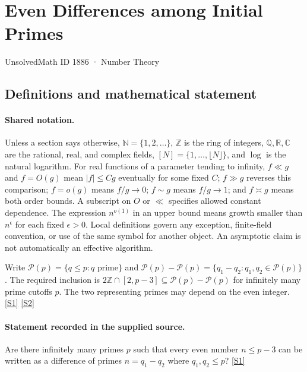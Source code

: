 \documentclass[11pt,a4paper]{article}
\newcommand{\N}{\mathbb{N}}
\newcommand{\Z}{\mathbb{Z}}
\newcommand{\Q}{\mathbb{Q}}
\newcommand{\R}{\mathbb{R}}
\newcommand{\C}{\mathbb{C}}
\newcommand{\sref}[2]{\hyperlink{source:#1:#2}{[S#2]}}
\begin{document}

\setcounter{section}{1885}

\section{Even Differences among Initial Primes}\label{1886}

{\small\sffamily UnsolvedMath ID 1886 · Number Theory}

\subsection{Definitions and mathematical statement}

\paragraph{Shared notation.}Unless a section says otherwise, $\N=\{1,2,\ldots\}$,
$\Z$ is the ring of integers, $\Q,\R,\C$ are the rational, real, and complex
fields, $[N]=\{1,\ldots,\lfloor N\rfloor\}$, and $\log$ is the natural
logarithm. For real functions of a parameter tending to infinity,
$f\ll g$ and $f=O(g)$ mean $|f|\leq Cg$ eventually for some fixed $C$;
$f\gg g$ reverses this comparison; $f=o(g)$ means $f/g\to0$;
$f\sim g$ means $f/g\to1$; and $f\asymp g$ means both order bounds.
A subscript on $O$ or $\ll$ specifies allowed constant dependence.
The expression $n^{o(1)}$ in an upper bound means growth smaller than
$n^\epsilon$ for each fixed $\epsilon>0$. Local definitions govern any
exception, finite-field convention, or use of the same symbol for another
object. An asymptotic claim is not automatically an effective algorithm.



Write $\mathcal P(p)=\{q\leq p:q\text{ prime}\}$ and $\mathcal P(p)-\mathcal P(p)=\{q_1-q_2:q_1,q_2\in\mathcal P(p)\}$. The required inclusion is $2\Z\cap[2,p-3]\subseteq\mathcal P(p)-\mathcal P(p)$ for infinitely many prime cutoffs $p$. The two representing primes may depend on the even integer. \sref{1886}{1} \sref{1886}{2}

\paragraph{Statement recorded in the supplied source.}
Are there infinitely many primes $p$ such that every even number $n\leq p-3$ can be written as a difference of primes $n=q_1-q_2$ where $q_1,q_2\leq p$? \sref{1886}{1}
\end{document}
